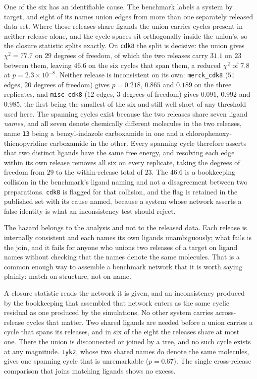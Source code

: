 One of the six has an identifiable cause. The benchmark labels a system by target, and eight of its
names union edges from more than one separately released data set. Where those releases share
ligands the union carries cycles present in neither release alone, and the cycle spaces sit
orthogonally inside the union's, so the closure statistic splits exactly. On \texttt{cdk8} the split
is decisive: the union gives $\chi^2=77.7$ on $29$ degrees of freedom, of which the two releases
carry $31.1$ on $23$ between them, leaving $46.6$ on the six cycles that span them, a reduced
$\chi^2$ of $7.8$ at $p=2.3\times10^{-8}$. Neither release is inconsistent on its own:
\texttt{merck\_cdk8} ($51$ edges, $20$ degrees of freedom) gives $p=0.218$, $0.865$ and $0.189$ on
the three replicates, and \texttt{misc\_cdk8} ($12$ edges, $3$ degrees of freedom) gives $0.091$,
$0.992$ and $0.985$, the first being the smallest of the six and still well short of any threshold
used here. The spanning cycles exist because the two releases share seven ligand \emph{names}, and
all seven denote chemically different molecules in the two releases, name \texttt{13} being a
benzyl-indazole carboxamide in one and a chlorophenoxy-thienopyridine carboxamide in the other.
Every spanning cycle therefore asserts that two distinct ligands have the same free energy, and resolving each edge within its own
release removes all six on every replicate, taking the degrees of freedom from $29$ to the
within-release total of $23$. The $46.6$ is a bookkeeping collision in the benchmark's ligand
naming and not a disagreement between two preparations. \texttt{cdk8} is flagged for that
collision, and the flag is retained in the published set with its cause named, because a system
whose network asserts a false identity is what an inconsistency test should reject.

The hazard belongs to the analysis and not to the released data. Each release is internally
consistent and each names its own ligands unambiguously; what fails is the join, and it fails for
anyone who unions two releases of a target on ligand names without checking that the names denote
the same molecules. That is a common enough way to assemble a benchmark network that it is worth
saying plainly: match on structure, not on name.

A closure statistic reads the network it is given, and an inconsistency produced by the bookkeeping
that assembled that network enters as the same cyclic residual as one produced by the simulations.
No other system carries across-release cycles that matter. Two shared ligands are needed before a
union carries a cycle that spans its releases, and in six of the eight the releases share at most
one. There the union is disconnected or joined by a tree, and no such cycle exists at any
magnitude. \texttt{tyk2}, whose two shared names do denote the same molecules, gives one spanning
cycle that is unremarkable ($p=0.67$). The single cross-release comparison that joins matching ligands shows
no excess.

